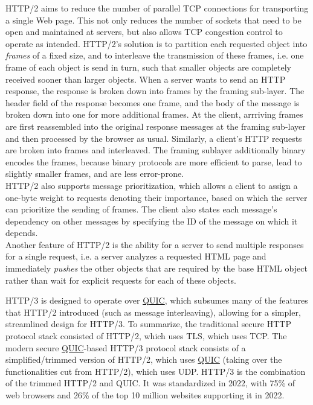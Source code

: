 \documentclass[8pt, table, xcdraw]{article}%
\begin{document}
HTTP/2 aims to reduce the number of parallel TCP connections for transporting a single Web page. This not only reduces the number of sockets that need to be open and maintained at servers, but also allows TCP congestion control to operate as intended. HTTP/2's solution is to partition each requested object into \emph{frames} of a fixed size, and to interleave the transmission of these frames, i.e. one frame of each object is send in turn, such that smaller objects are completely received sooner than larger objects. When a server wants to send an HTTP response, the response is broken down into frames by the framing sub-layer. The header field of the response becomes one frame, and the body of the message is broken down into one for more additional frames. At the client, arrriving frames are first reassembled into the original response messages at the framing sub-layer and then processed by the browser as usual. Similarly, a client’s HTTP requests are broken into frames and interleaved. The framing sublayer additionally binary encodes the frames, because binary protocols are more efficient to parse, lead to slightly smaller frames, and are less error-prone.\\
HTTP/2 also supports message prioritization, which allows a client to assign a one-byte weight to requests denoting their importance, based on which the server can prioritize the sending of frames. The client also states each message’s dependency on other messages by specifying the ID of the message on which it depends.\\
Another feature of HTTP/2 is the ability for a server to send multiple responses for a single request, i.e. a server analyzes a requested HTML page and immediately \emph{pushes} the other objects that are required by the base HTML object rather than wait for explicit requests for each of these objects.

HTTP/3 is designed to operate over \hyperref[ch:transport:quic]{QUIC}, which subsumes many of the features that HTTP/2 introduced (such as message interleaving), allowing for a simpler, streamlined design for HTTP/3. To summarize, the traditional secure HTTP protocol stack consisted of HTTP/2, which uses TLS, which uses TCP. The modern secure \hyperref[ch:transport:quic]{QUIC}-based HTTP/3 protocol stack consists of a simplified/trimmed version of HTTP/2, which uses \hyperref[ch:transport:quic]{QUIC} (taking over the functionalities cut from HTTP/2), which uses UDP. HTTP/3 is the combination of the trimmed HTTP/2 and QUIC. It was standardized in 2022, with 75\% of web browsers and 26\% of the top 10 million websites supporting it in 2022.
\end{document}
